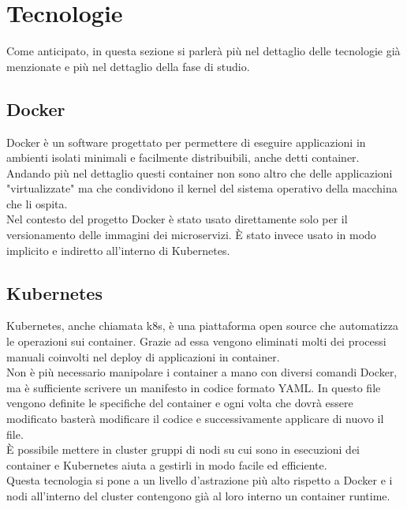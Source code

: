 \documentclass[a4paper,12pt]{report}
\begin{document}
\section{Tecnologie}
Come anticipato, in questa sezione si parlerà più nel dettaglio delle tecnologie già menzionate e più nel dettaglio della fase di studio.
\subsection{Docker}
Docker è un software progettato per permettere di eseguire applicazioni in ambienti isolati minimali e facilmente distribuibili, anche detti container. \cite{docker} \\
Andando più nel dettaglio questi container non sono altro che delle applicazioni "virtualizzate" ma che condividono il kernel del sistema operativo della macchina che li ospita. \\
Nel contesto del progetto Docker è stato usato direttamente solo per il versionamento delle immagini dei microservizi. È stato invece usato in modo implicito e indiretto all'interno di Kubernetes.
\subsection{Kubernetes}
Kubernetes, anche chiamata k8s, è una piattaforma open source che automatizza le operazioni sui container. Grazie ad essa vengono eliminati molti dei processi manuali coinvolti nel deploy di applicazioni in container. \\
Non è più necessario manipolare i container a mano con diversi comandi Docker, ma è sufficiente scrivere un manifesto in codice formato YAML. In questo file vengono definite le specifiche del container e ogni volta che dovrà essere modificato basterà modificare il codice e successivamente applicare di nuovo il file. \\
È possibile mettere in cluster gruppi di nodi su cui sono in esecuzioni dei container e Kubernetes aiuta a gestirli in modo facile ed efficiente.\\
Questa tecnologia si pone a un livello d'astrazione più alto rispetto a Docker e i nodi all'interno del cluster contengono già al loro interno un container runtime.\cite{kubernetes}\\ \\
\end{document}
